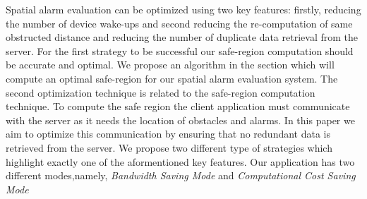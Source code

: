 \documentclass{sig-alternate}
\begin{document}
Spatial alarm evaluation can be optimized using two key features: firstly, reducing the number of device wake-ups and second reducing the re-computation of same obstructed distance and reducing the number of duplicate data retrieval from the server. For the first strategy to be successful our safe-region computation should be accurate and optimal. We propose an algorithm in the section which will compute an optimal safe-region for our spatial alarm evaluation system. The second optimization technique is related to the safe-region computation technique. To compute the safe region the client application must communicate with the server as it needs the location of obstacles and alarms. In this paper we aim to optimize this communication by ensuring that no redundant data is retrieved from the server. We propose two different type of strategies which highlight exactly one of the aformentioned key features. Our application has two different modes,namely, \textit{Bandwidth Saving Mode} and \textit{Computational Cost Saving Mode}
\end{document}
